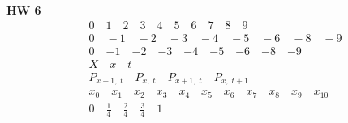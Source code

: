 \documentclass[
    final,
    a4paper,
    oneside,
    parskip=full,
    headings=standardclasses,
    headings=big,
    pointednumbers,
    fleqn,
    numbers=noenddot
]{scrartcl}
\newcommand{\fs}[2]{{\tfrac{#1}{#2}}}
\begin{document}
    {\bf{HW 6}} \\
    {\setlength{\abovedisplayskip}{-6pt}
    \setlength{\belowdisplayskip}{-12pt}
    \begin{align*}
        & 0 \quad 1 \quad 2 \quad 3 \quad 4 \quad 5 \quad 6 \quad 7 \quad 8 \quad 9 \\
        & 0 \quad -1 \quad -2 \quad -3 \quad -4 \quad -5 \quad -6 \quad -8 \quad -9 \\
        & 0 \quad {-1} \quad {-2} \quad {-3} \quad {-4} \quad {-5} \quad {-6} \quad {-8} \quad {-9} \\
        & X \quad x \quad t \\
        & P_{{x-1},\;t} \quad P_{{x},\;t} \quad P_{{x+1},\;t} \quad P_{{x},\;{t+1}} \\
        & x_0 \quad x_1 \quad x_2 \quad x_3 \quad x_4 \quad x_5 \quad x_6 \quad x_7 \quad x_8 \quad x_9 \quad x_{10} \\
        & 0 \quad \fs{1}{4} \quad \fs{2}{4} \quad \fs{3}{4} \quad 1 \\
    \end{align*}} \\

    
\end{document}
